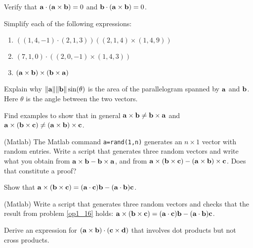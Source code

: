 \begin{problem}
\label{op1_13}
Verify that $\aa\cdot(\aa\times\bb)=0$ and $\bb\cdot(\aa\times\bb)=0$.
\end{problem}

\begin{problem}
\label{2008_a2_1} Simplify each of the following expressions:
{\begin{enumerate}
\renewcommand{\labelenumi}{(\alph{enumi})}
\item $((1,4,-1)\cdot(2,1,3)) ((2,1,4) \times (1,4,9))$
\item $(7,1,0)\cdot ((2,0,-1) \times (1,4,3))$
\item $(\aa \times \bb) \times (\bb \times \aa)$
\end{enumerate}}
\end{problem}

\begin{problem}
\label{op1_14}
Explain why $\|\aa\|\|\bb\|\sin(\theta)$ is the area of the
parallelogram spanned by $\aa$ and $\bb$. Here $\theta$ is the angle
between the two vectors.
\end{problem}

\begin{problem}
\label{op1_15}
Find examples to show that in general $\aa\times\bb\ne\bb\times\aa$
and $\aa\times(\bb\times\cc)\ne(\aa\times\bb)\times\cc$.
\end{problem}

\begin{problem}
\label{matlab_op1_15}
(Matlab) The Matlab command {\tt a=rand(1,n)} generates an $n\times 1$ vector with random entries. Write a script that generates three random vectors and write what you obtain from $\aa\times\bb-\bb\times\aa$,
and from $\aa\times(\bb\times\cc)-(\aa\times\bb)\times\cc$. Does that constitute a proof?
\end{problem}

\begin{problem}
\label{op1_16}
Show that $\aa\times(\bb\times\cc)=(\aa\cdot\cc)\bb-(\aa\cdot\bb)\cc$.
\end{problem}

\begin{problem}
\label{matlab_op1_16}
(Matlab) Write a script that generates three random vectors and checks that the result from problem \ref{op1_16} holds: $\aa\times(\bb\times\cc)=(\aa\cdot\cc)\bb-(\aa\cdot\bb)\cc$.
\end{problem}

\begin{problem}
\label{op1_17}
Derive an expression for $(\aa\times\bb)\cdot(\cc\times{\bf d})$ that
involves dot products but not cross products.
\end{problem}

